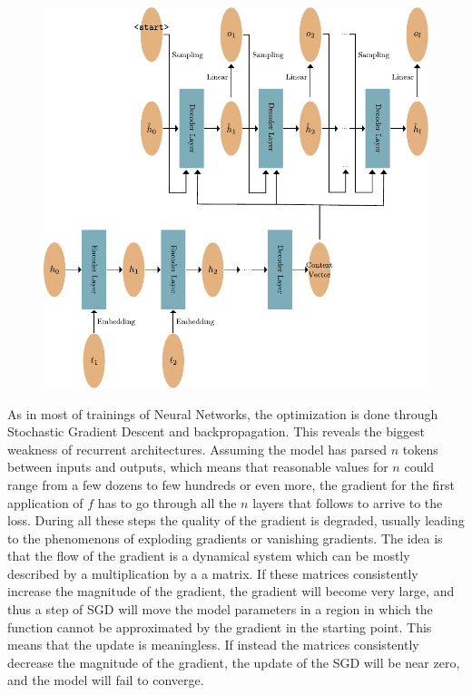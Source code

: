 \documentclass[]{marticle}
\begin{document}
\begin{figure}[] 
\begin{center}
\includegraphics{recurrent_context.pdf}
\caption{} 
\end{center}
\end{figure}

As in most of trainings of Neural Networks, the optimization is done through Stochastic Gradient
Descent and backpropagation. This reveals the biggest weakness of recurrent architectures. Assuming
the model has parsed $n$ tokens between inputs and outputs, which means that reasonable values for
$n$ could range from a few dozens to few hundreds or even more, the gradient for the first
application of $f$ has to go through all the $n$ layers that follows to arrive to the loss. During
all these steps the quality of the gradient is degraded, usually leading to the phenomenons of
exploding gradients or vanishing gradients. The idea is that the flow of the gradient is a dynamical
system which can be mostly described by a multiplication by a a matrix. If these matrices
consistently increase the magnitude of the gradient, the gradient will become very large, and thus a
step of SGD will move the model parameters in a region in which the function cannot be approximated
by the gradient in the starting point. This means that the update is meaningless. If instead the
matrices consistently decrease the magnitude of the gradient, the update of the SGD will be near
zero, and the model will fail to converge.
\end{document}
